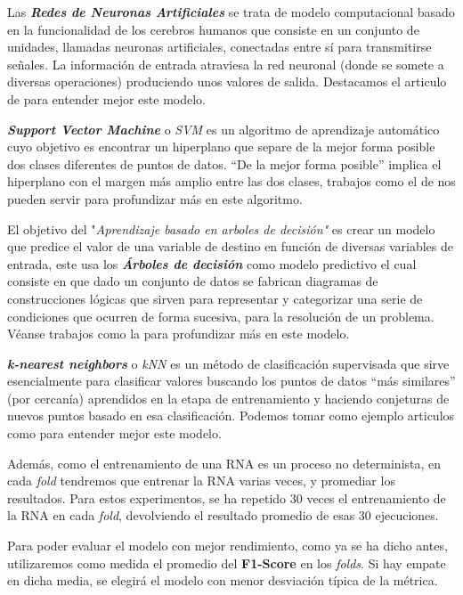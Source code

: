 \documentclass[12pt]{article}
\begin{document}
\bigskip
Las \textbf{\textit{Redes de Neuronas Artificiales}} se trata de modelo computacional basado en la funcionalidad de los cerebros humanos 
que consiste en un conjunto de unidades, llamadas neuronas artificiales, conectadas entre sí para transmitirse señales. La información 
de entrada atraviesa la red neuronal (donde se somete a diversas operaciones) produciendo unos valores de salida. Destacamos el articulo de 
\cite{krogh2008artificial} para entender mejor este modelo.

\bigskip
\textbf{\textit{Support Vector Machine}} o \textit{SVM} es un algoritmo de aprendizaje automático cuyo objetivo es encontrar un hiperplano 
que separe de la mejor forma posible dos clases diferentes de puntos de datos. “De la mejor forma posible” 
implica el hiperplano con el margen más amplio entre las dos clases, trabajos como el de \cite{cortes1995support} nos pueden servir 
para profundizar más en este algoritmo.

\bigskip
El objetivo del "\textit{Aprendizaje basado en arboles de decisión"} es crear un modelo que predice el valor de una variable de 
destino en función de diversas variables de entrada, este usa los \textbf{\textit{Árboles de decisión}} como modelo predictivo el cual 
consiste en que dado un conjunto de datos se fabrican diagramas de construcciones lógicas que sirven para
representar y categorizar una serie de condiciones que ocurren de forma sucesiva, para la resolución de un 
problema. Véanse trabajos como la \cite{myles2004introduction} para profundizar más en este modelo.

\bigskip
\textbf{\textit{ k-nearest neighbors}} o \textit{kNN} es un método de clasificación supervisada que sirve esencialmente para clasificar valores
 buscando los puntos de datos “más similares” (por cercanía) aprendidos en la etapa de entrenamiento y haciendo conjeturas de nuevos 
 puntos basado en esa clasificación. Podemos tomar como ejemplo articulos como \cite{guo2003knn} para entender mejor este modelo.

\bigskip
Además, como el entrenamiento de una RNA es un proceso no determinista, en cada \textit{fold}
tendremos que entrenar la RNA varias veces, y promediar los resultados. Para estos experimentos,
se ha repetido 30 veces el entrenamiento de la RNA en cada \textit{fold}, devolviendo el resultado promedio de esas 30 ejecuciones.

\bigskip
Para poder evaluar el modelo con mejor rendimiento, como ya se ha dicho antes, utilizaremos como medida el promedio
del \textbf{F1-Score} en los \textit{folds}. Si hay empate en dicha media, se elegirá el modelo con menor
desviación típica de la métrica.
\end{document}
